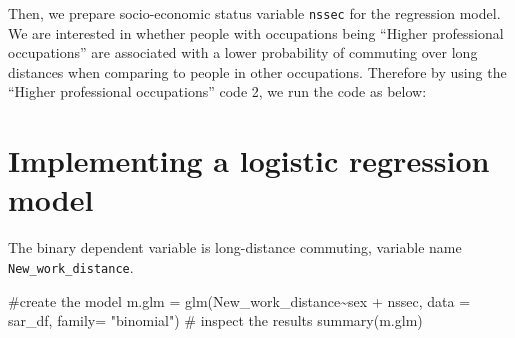 \documentclass[
  letterpaper,
  DIV=11,
  numbers=noendperiod]{scrreprt}
\newenvironment{Shaded}{\begin{snugshade}}{\end{snugshade}}
\newcommand{\AttributeTok}[1]{\textcolor[rgb]{0.40,0.45,0.13}{#1}}
\newcommand{\CommentTok}[1]{\textcolor[rgb]{0.37,0.37,0.37}{#1}}
\newcommand{\FunctionTok}[1]{\textcolor[rgb]{0.28,0.35,0.67}{#1}}
\newcommand{\NormalTok}[1]{\textcolor[rgb]{0.00,0.23,0.31}{#1}}
\newcommand{\OtherTok}[1]{\textcolor[rgb]{0.00,0.23,0.31}{#1}}
\newcommand{\SpecialCharTok}[1]{\textcolor[rgb]{0.37,0.37,0.37}{#1}}
\newcommand{\StringTok}[1]{\textcolor[rgb]{0.13,0.47,0.30}{#1}}
\begin{document}
Then, we prepare socio-economic status variable \texttt{nssec} for the
regression model. We are interested in whether people with occupations
being ``Higher professional occupations'' are associated with a lower
probability of commuting over long distances when comparing to people in
other occupations. Therefore by using the ``Higher professional
occupations'' code 2, we run the code as below:

\begin{Shaded}
\end{Shaded}

\section{\texorpdfstring{\textbf{Implementing a logistic regression
model}}{Implementing a logistic regression model}}\label{implementing-a-logistic-regression-model}

The binary dependent variable is long-distance commuting, variable name
\texttt{New\_work\_distance}.

\begin{Shaded}
\begin{Highlighting}[]
\CommentTok{\#create the model}
\NormalTok{m.glm }\OtherTok{=} \FunctionTok{glm}\NormalTok{(New\_work\_distance}\SpecialCharTok{\textasciitilde{}}\NormalTok{sex }\SpecialCharTok{+}\NormalTok{ nssec, }
            \AttributeTok{data =}\NormalTok{ sar\_df, }
            \AttributeTok{family=} \StringTok{"binomial"}\NormalTok{)}
\CommentTok{\# inspect the results}
\FunctionTok{summary}\NormalTok{(m.glm) }
\end{Highlighting}
\end{Shaded}
\end{document}
